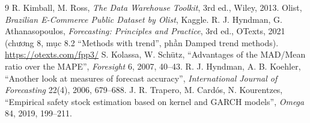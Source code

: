 \begin{thebibliography}{9}
 R. Kimball, M. Ross, \textit{The Data Warehouse Toolkit}, 3rd ed., Wiley, 2013.
 Olist, \textit{Brazilian E-Commerce Public Dataset by Olist}, Kaggle.
 R. J. Hyndman, G. Athanasopoulos, \textit{Forecasting: Principles and Practice}, 3rd ed., OTexts, 2021 (chương 8, mục 8.2 ``Methods with trend'', phần Damped trend methods). \url{https://otexts.com/fpp3/}
 S. Kolassa, W. Schütz, ``Advantages of the MAD/Mean ratio over the MAPE'', \textit{Foresight} 6, 2007, 40--43.
 R. J. Hyndman, A. B. Koehler, ``Another look at measures of forecast accuracy'', \textit{International Journal of Forecasting} 22(4), 2006, 679--688.
 J. R. Trapero, M. Cardós, N. Kourentzes, ``Empirical safety stock estimation based on kernel and GARCH models'', \textit{Omega} 84, 2019, 199--211.
\end{thebibliography}
